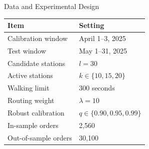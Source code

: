 \documentclass[aspectratio=169,11pt]{beamer}
\begin{document}
\begin{frame}{Data and Experimental Design}

	\begin{table}
		\centering
		\small
		\begin{tabular}{ll}
			\toprule
			Item                 & Setting                      \\
			\midrule
			Calibration window   & April 1--3, 2025             \\
			Test window          & May 1--31, 2025              \\
			Candidate stations   & \(l = 30\)                   \\
			Active stations      & \(k \in \{10,15,20\}\)       \\
			Walking limit        & 300 seconds                  \\
			Routing weight       & \(\lambda = 10\)             \\
			Robust calibration   & \(q \in \{0.90,0.95,0.99\}\) \\
			In-sample orders     & 2,560                        \\
			Out-of-sample orders & 30,100                       \\
			\bottomrule
		\end{tabular}
	\end{table}
\end{frame}


% 
\end{document}
